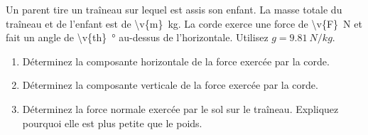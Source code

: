 Un parent tire un traîneau sur lequel est assis son enfant. La masse totale du traîneau et de l'enfant est de \qty{\v{m}}{kg}. La corde exerce une force de \qty{\v{F}}{N} et fait un angle de \qty{\v{th}}{\degree} au-dessus de l'horizontale. Utilisez $g = \qty{9.81}{N/kg}$.

\begin{enumerate}[label=\alph*)]
    \item Déterminez la composante horizontale de la force exercée par la corde.
    \item Déterminez la composante verticale de la force exercée par la corde.
    \item Déterminez la force normale exercée par le sol sur le traîneau. Expliquez pourquoi elle est plus petite que le poids.
\end{enumerate}
